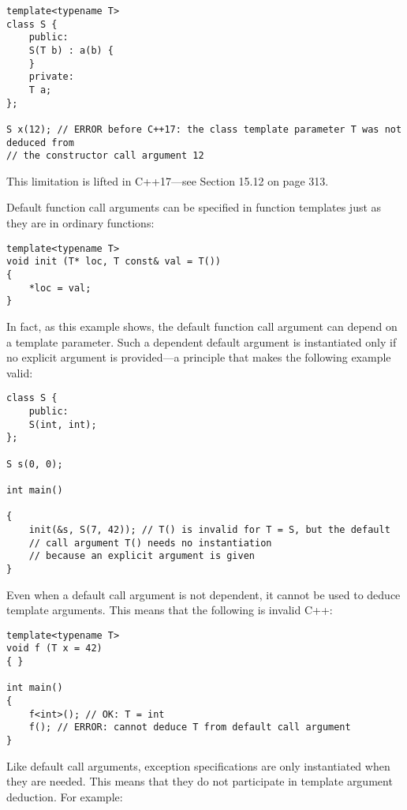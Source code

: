 \begin{lstlisting}[style=styleCXX]
template<typename T>
class S {
	public:
	S(T b) : a(b) {
	}
	private:
	T a;
};

S x(12); // ERROR before C++17: the class template parameter T was not deduced from
// the constructor call argument 12
\end{lstlisting}

This limitation is lifted in C++17—see Section 15.12 on page 313.





Default function call arguments can be specified in function templates just as they are in ordinary functions:

\begin{lstlisting}[style=styleCXX]
template<typename T>
void init (T* loc, T const& val = T())
{
	*loc = val;
}
\end{lstlisting}

In fact, as this example shows, the default function call argument can depend on a template parameter. Such a dependent default argument is instantiated only if no explicit argument is provided—a principle that makes the following example valid:

\begin{lstlisting}[style=styleCXX]
class S {
	public:
	S(int, int);
};

S s(0, 0);

int main()

{
	init(&s, S(7, 42)); // T() is invalid for T = S, but the default
	// call argument T() needs no instantiation
	// because an explicit argument is given
}
\end{lstlisting}

Even when a default call argument is not dependent, it cannot be used to deduce template arguments. This means that the following is invalid C++:

\begin{lstlisting}[style=styleCXX]
template<typename T>
void f (T x = 42)
{ }

int main()
{
	f<int>(); // OK: T = int
	f(); // ERROR: cannot deduce T from default call argument
}
\end{lstlisting}


Like default call arguments, exception specifications are only instantiated when they are needed. This means that they do not participate in template argument deduction. For example:

